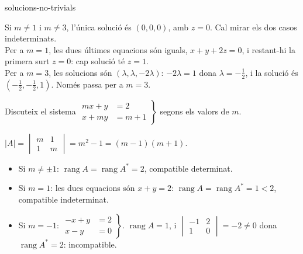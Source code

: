 \begin{apartats}
\begin{tria}{solucions-no-trivials}
\begin{solucio}
Si $m\ne1$ i $m\ne3$, l'única solució és $(0,0,0)$, amb $z=0$. Cal mirar els dos casos indeterminats.\\
Per a $m=1$, les dues últimes equacions són iguals, $x+y+2z=0$, i restant-hi la primera surt $z=0$:
cap solució té $z=1$.\\
Per a $m=3$, les solucions són $(\lambda,\lambda,-2\lambda)$: $-2\lambda=1$ dona $\lambda=-\frac12$, i la
solució és $\left(-\frac12,-\frac12,1\right)$. Només passa per a $m=3$.
\end{solucio}
\end{tria}

\begin{nomesllarg}
Discuteix el sistema $\left.\begin{aligned}mx+y&=2\\x+my&=m+1\end{aligned}\right\}$ segons els valors
de $m$.

\begin{solucio}
$|A|=\begin{vmatrix}m&1\\1&m\end{vmatrix}=m^2-1=(m-1)(m+1)$.
\begin{itemize}
\item Si $m\ne\pm1$: $\operatorname{rang}A=\operatorname{rang}A^*=2$, compatible determinat.
\item Si $m=1$: les dues equacions són $x+y=2$: $\operatorname{rang}A=\operatorname{rang}A^*=1<2$,
compatible indeterminat.
\item Si $m=-1$: $\left.\begin{aligned}-x+y&=2\\x-y&=0\end{aligned}\right\}$. $\operatorname{rang}A=1$, i
$\begin{vmatrix}-1&2\\1&0\end{vmatrix}=-2\ne0$ dona $\operatorname{rang}A^*=2$: incompatible.
\end{itemize}
\end{solucio}
\end{nomesllarg}

\end{apartats}
